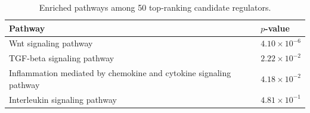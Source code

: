 \documentclass{article}
\begin{document}
\begin{table}[htb]
  \caption{Enriched pathways among 50 top-ranking candidate regulators. }
  \label{tab:pathways}
 \centering
  \begin{tabularx}{\columnwidth}{Xl}
    Pathway & $p$-value \\
    \hline
    Wnt signaling pathway &	$4.10\times 10^{-6}$ \\
    TGF-beta signaling pathway & $2.22\times 10^{-2}$ \\
    Inflammation mediated by chemokine and cytokine signaling pathway & $4.18\times 10^{-2}$ \\
    Interleukin signaling pathway & $4.81\times 10^{-1}$\\
  \end{tabularx}
 \end{table}

\end{document}
